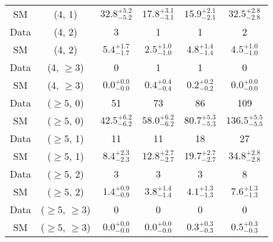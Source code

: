 \begin{table}[h!]
{\begin{tabular}{cccccc}
	SM & (4, 1) & $32.8^{+ 5.2 }_{- 5.2 }$ & $17.8^{+ 3.1 }_{- 3.1 }$ & $15.9^{+ 2.1 }_{- 2.1 }$ & $32.5^{+ 2.8 }_{- 2.8 }$ \\[0.5ex] 
	Data & (4, 2) & 3 & 1 & 1 & 2 \\[0.5ex] 
	SM & (4, 2) & $5.4^{+ 1.7 }_{- 1.7 }$ & $2.5^{+ 1.0 }_{- 1.0 }$ & $4.8^{+ 1.4 }_{- 1.4 }$ & $4.5^{+ 1.0 }_{- 1.0 }$ \\[0.5ex] 
	Data & (4, $\ge3$) & 0 & 1 & 1 & 0 \\[0.5ex] 
	SM & (4, $\ge3$) & $0.0^{+ 0.0 }_{- 0.0 }$ & $0.4^{+ 0.4 }_{- 0.4 }$ & $0.2^{+ 0.2 }_{- 0.2 }$ & $0.0^{+ 0.0 }_{- 0.0 }$ \\[0.5ex] 
	Data & ($\ge5$, 0) & 51 & 73 & 86 & 109 \\[0.5ex] 
	SM & ($\ge5$, 0) & $42.5^{+ 6.2 }_{- 6.2 }$ & $58.0^{+ 6.2 }_{- 6.2 }$ & $80.7^{+ 5.3 }_{- 5.3 }$ & $136.5^{+ 5.5 }_{- 5.5 }$ \\[0.5ex] 
	Data & ($\ge5$, 1) & 11 & 11 & 18 & 27 \\[0.5ex] 
	SM & ($\ge5$, 1) & $8.4^{+ 2.3 }_{- 2.3 }$ & $12.8^{+ 2.7 }_{- 2.7 }$ & $19.7^{+ 2.7 }_{- 2.7 }$ & $34.8^{+ 2.8 }_{- 2.8 }$ \\[0.5ex] 
	Data & ($\ge5$, 2) & 3 & 3 & 3 & 8 \\[0.5ex] 
	SM & ($\ge5$, 2) & $1.4^{+ 0.9 }_{- 0.9 }$ & $3.8^{+ 1.4 }_{- 1.4 }$ & $4.1^{+ 1.3 }_{- 1.3 }$ & $7.6^{+ 1.3 }_{- 1.3 }$ \\[0.5ex] 
	Data & ($\ge5$, $\ge3$) & 0 & 0 & 0 & 0 \\[0.5ex] 
	SM & ($\ge5$, $\ge3$) & $0.0^{+ 0.0 }_{- 0.0 }$ & $0.0^{+ 0.0 }_{- 0.0 }$ & $0.3^{+ 0.3 }_{- 0.3 }$ & $0.5^{+ 0.3 }_{- 0.3 }$ \\[0.5ex] 
	\hline
	\hline
\end{tabular}}
\end{table}
